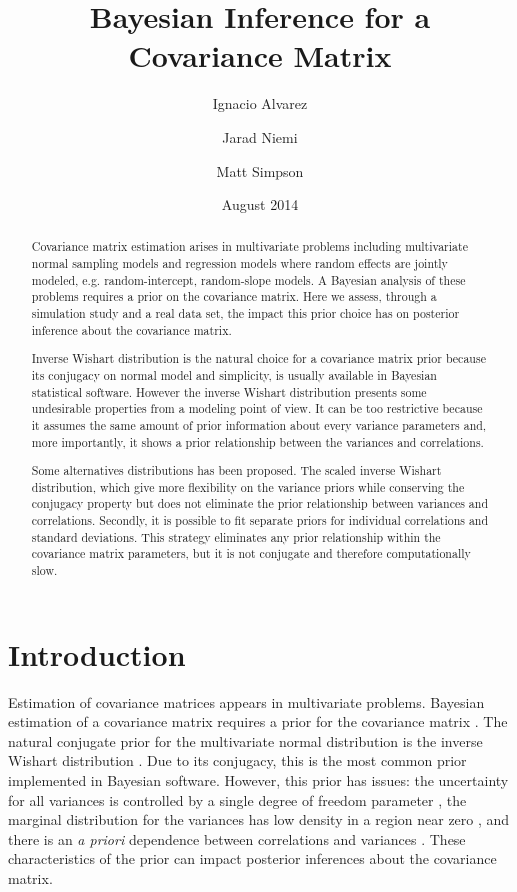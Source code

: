 \documentclass[12pt]{article}
\title{Bayesian Inference for a Covariance Matrix}
\author[1]{Ignacio Alvarez }
\author[1]{Jarad Niemi }
\author[2]{ Matt Simpson}
\affil[1]{Department of Statistics, Iowa State University}
\affil[2]{Department of Statistics and Department of Economics, Iowa State University}
\date{August 2014}
\begin{document}
 
\maketitle 


\begin{abstract}
Covariance matrix estimation arises in multivariate problems including multivariate normal sampling models and regression models where random effects are jointly modeled, e.g. random-intercept, random-slope models. A Bayesian analysis of these problems requires a prior on the covariance matrix. Here we assess, through a simulation study and a real data set, the impact this prior choice has on posterior inference about the covariance matrix.

Inverse Wishart distribution is the natural choice for a covariance matrix prior because its conjugacy on normal model and simplicity, is usually available in Bayesian statistical software. However the  inverse Wishart distribution presents some undesirable properties from a modeling point of view. It can be too restrictive because it assumes the same amount of prior information about every variance parameters and, more importantly, it shows a prior relationship between the variances and correlations. 

Some alternatives distributions has been proposed. The scaled inverse Wishart distribution, which give more flexibility on the variance priors while conserving the conjugacy property but does not eliminate the prior relationship between variances and correlations. Secondly, it is possible to fit separate priors for individual correlations and standard deviations. This strategy eliminates any prior relationship within the covariance matrix parameters, but it is not conjugate and therefore computationally slow. 
\end{abstract}

\newpage 

\section{Introduction} 

Estimation of covariance matrices appears in multivariate problems. Bayesian estimation of a covariance matrix requires a prior for the covariance matrix . The natural conjugate prior for the multivariate normal distribution is the inverse Wishart distribution \citep{barnard2000}. Due to its conjugacy, this is the most common prior implemented in Bayesian software. However, this prior has issues: the uncertainty for all variances is controlled by a single degree of freedom parameter \citep{bda2013}, the marginal distribution for the variances has low density in a region near zero \citep{gelman2006prior}, and there is an \emph{a priori} dependence between correlations and variances \citep{visualize}. These characteristics of the prior can impact posterior inferences about the covariance matrix. 
\end{document}
